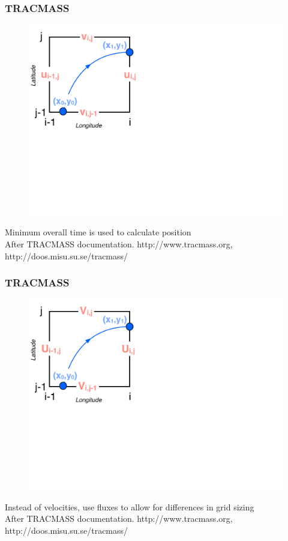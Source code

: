 \documentclass[ignorenonframetext]{beamer}
\begin{document}
\begin{frame}[t,noframenumbering]\frametitle{TRACMASS}
	\begin{figure}[htbp]
		\centering
		\includegraphics[width=.5\textwidth]{figures/tracmass_box10}
	\end{figure}
	{\Large Minimum overall time is used to calculate position}
	\tiny{\\After TRACMASS documentation. http://www.tracmass.org, http://doos.misu.su.se/tracmass/}
\end{frame}
\begin{frame}[t,noframenumbering]\frametitle{TRACMASS}
	\begin{figure}[htbp]
		\centering
		\includegraphics[width=.5\textwidth]{figures/tracmass_box11}
	\end{figure}
	{\Large Instead of velocities, use fluxes to allow for differences in grid sizing}
	\tiny{\\After TRACMASS documentation. http://www.tracmass.org, http://doos.misu.su.se/tracmass/}
\end{frame}


\end{document}
